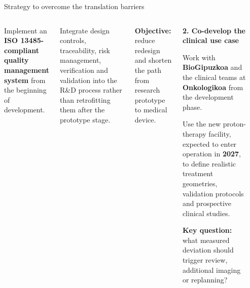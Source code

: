 \documentclass[aspectratio=169,11pt]{beamer}
\begin{document}
\begin{frame}{Strategy to overcome the translation barriers}
\begin{columns}[T,onlytextwidth]
{\begin{minipage}[t][2.55cm][t]{0.94\linewidth}
{\tiny
Implement an \textbf{ISO 13485-compliant quality management system}
from the beginning of development.

\vspace{0.10cm}

Integrate design controls, traceability, risk management,
verification and validation into the R\&D process rather than
retrofitting them after the prototype stage.

\vspace{0.10cm}

\textbf{Objective:} reduce redesign and shorten the path
from research prototype to medical device.
}

\end{minipage}
}



\colorbox{blue!4}{
\begin{minipage}[t][2.55cm][t]{0.94\linewidth}

{\scriptsize\bfseries\color{PTblue}
2. Co-develop the clinical use case
}

\vspace{0.10cm}

{\tiny
Work with \textbf{BioGipuzkoa} and the clinical teams at
\textbf{Onkologikoa} from the development phase.

\vspace{0.10cm}

Use the new proton-therapy facility, expected to enter operation
in \textbf{2027}, to define realistic treatment geometries,
validation protocols and prospective clinical studies.

\vspace{0.10cm}

\textbf{Key question:} what measured deviation should trigger
review, additional imaging or replanning?
}

\end{minipage}
}

\vspace{0.18cm}

\colorbox{blue!4}{
\begin{minipage}[t][2.55cm][t]{0.94\linewidth}


\end{minipage}}
\end{columns}
\end{frame}
\end{document}

